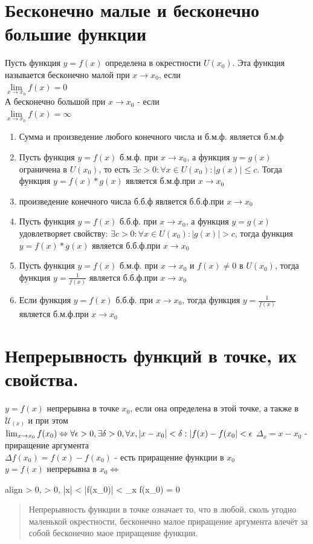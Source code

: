 \documentclass[oneside]{book}
\newcommand{\boxedeq}[2]{\begin{empheq}[box={\fboxsep=6pt\fbox}]{align}\label{#1}#2\end{empheq}}
\begin{document}
\begin{enumerate}
\chapter{Бесконечно малые и бесконечно большие функции}
Пусть функция $y = f(x)$ определена в окрестности $U(x_0)$. Эта функция называется бесконечно малой при $x \rightarrow x_0$, если\\ $\lim\limits_{x\rightarrow x_0}f(x)=0$\\
А бесконечно большой при $x \rightarrow x_0$ - если\\ $\lim\limits_{x\rightarrow x_0}f(x)=\infty$
\begin{enumerate}
	\item Сумма и произведение любого конечного числа и б.м.ф. является б.м.ф
	\item Пусть функция $y = f(x)$ б.м.ф. при $x \rightarrow x_0$, а функция $y = g(x)$ ограничена в $U(x_0)$, то есть  $\exists c > 0 : \forall x \in U(x_0): |g(x)|\leq c$. Тогда функция $y=f(x)*g(x)$ является б.м.ф.при $x \rightarrow x_0$
	\item произведение конечного числа б.б.ф является б.б.ф.при $x \rightarrow x_0$
	\item Пусть функция $y = f(x)$ б.б.ф. при $x \rightarrow x_0$, а функция $y = g(x)$ удовлетворяет свойству: $\exists c > 0 : \forall x \in U(x_0): |g(x)| > c$, тогда функция $y=f(x)*g(x)$ является б.б.ф.при $x \rightarrow x_0$
	\item Пусть функция $y = f(x)$ б.м.ф. при $x \rightarrow x_0$ и $f(x) \neq 0$ в $U(x_0)$, тогда функция $y=\frac{1}{f(x)}$ является б.б.ф.при $x \rightarrow x_0$
	\item Если функция $y = f(x)$ б.б.ф. при $x \rightarrow x_0$, тогда функция $y=\frac{1}{f(x)}$ является б.м.ф.при $x \rightarrow x_0$
\end{enumerate}

\setcounter{chapter}{10}
\chapter[Непрерывность]{Непрерывность функций в точке, их свойства.}
$y = f(x)$ непрерывна в точке $x_0$, если она определена в этой точке, а также в $\mathcal{U}_{(x)}$ и при этом
$\lim_{x \rightarrow x_0}{f(x_0) \Leftrightarrow \\ \forall \epsilon > 0, \exists \delta > 0, \forall x, |x - x_0|
< \delta : |f(x) - f(x_0| < \epsilon }$
$\Delta_x = x-x_0$ - приращение аргумента \\
$\Delta f(x_0) = f(x) - f(x_0)$ - есть приращение функции в $x_0$ \\
$y = f(x)$ непрерывна в $x_0 \Leftrightarrow$
\boxedeq{eq:*}{
    \forall \epsilon > 0, \exists \delta > 0, |\Delta x| < \delta \Rightarrow |\Delta f(x_0)|
    < \epsilon \Leftrightarrow \lim_{\Delta x \rightarrow 0}{\Delta f(x_0)} = 0
}
\begin{quote}
    Непрерывность функции в точке означает то, что в любой, сколь угодно маленькой окрестности, бесконечно малое приращение аргумента
    влечёт за собой бесконечно маое приращение функции.
\end{quote}


\end{enumerate}
\end{document}
